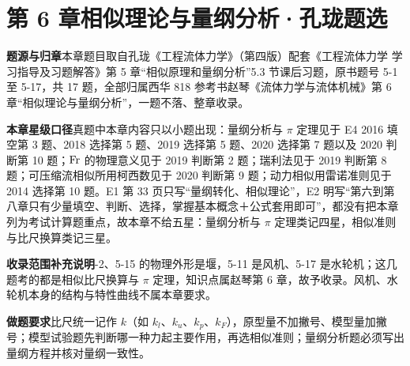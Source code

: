 \chapter*{第 6 章\quad 相似理论与量纲分析·孔珑题选}

\begin{tishi}
\noindent\textbf{题源与归章}\quad 本章题目取自孔珑《工程流体力学》（第四版）配套《工程流体力学 学习指导及习题解答》第 5 章“相似原理和量纲分析”5.3 节课后习题，原书题号 5-1 至 5-17，共 17 题，全部归属西华 818 参考书赵琴《流体力学与流体机械》第 6 章“相似理论与量纲分析”，一题不落、整章收录。

\noindent\textbf{本章星级口径}\quad 真题中本章内容只以小题出现：量纲分析与 $\pi$ 定理见于 E4 2016 填空第 3 题、2018 选择第 5 题、2019 选择第 5 题、2020 选择第 7 题以及 2020 判断第 10 题；$\mathrm{Fr}$ 的物理意义见于 2019 判断第 2 题；瑞利法见于 2019 判断第 8 题；可压缩流相似所用柯西数见于 2020 判断第 9 题；动力相似用雷诺准则见于 2014 选择第 10 题。E1 第 33 页只写“量纲转化、相似理论”，E2 明写“第六到第八章只有少量填空、判断、选择，掌握基本概念＋公式套用即可”，都没有把本章列为考试计算题重点，故本章不给五星：量纲分析与 $\pi$ 定理类记四星，相似准则与比尺换算类记三星。

\noindent\textbf{收录范围补充说明}-2、5-15 的物理外形是堰，5-11 是风机、5-17 是水轮机；这几题考的都是相似比尺换算与 $\pi$ 定理，知识点属赵琴第 6 章，故予收录。风机、水轮机本身的结构与特性曲线不属本章要求。

\noindent\textbf{做题要求}\quad 比尺统一记作 $k$（如 $k_l$、$k_u$、$k_p$、$k_F$），原型量不加撇号、模型量加撇号；模型试验题先判断哪一种力起主要作用，再选相似准则；量纲分析题必须写出量纲方程并核对量纲一致性。
\end{tishi}

